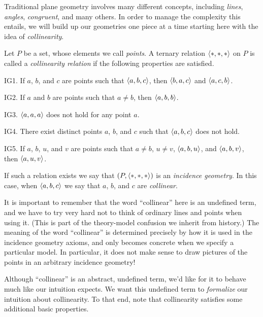 Traditional plane geometry involves many different concepts, including \emph{lines}, \emph{angles}, \emph{congruent}, and many others.
In order to manage the complexity this entails, we will build up our geometries one piece at a time starting here with the idea of \emph{collinearity}.

\begin{dfn} \label{dfn:incidence-geometry}
Let \(P\) be a set, whose elements we call \emph{points}.
A ternary relation \(\langle \ast, \ast, \ast \rangle\) on \(P\) is called a \emph{collinearity relation} if the following properties are satisfied.
\begin{proplist}
\item[IG1.] If \(a\), \(b\), and \(c\) are points such that \(\langle a, b, c \rangle\), then \(\langle b, a, c \rangle\) and \(\langle a, c, b \rangle\).
\item[IG2.] If \(a\) and \(b\) are points such that \(a \neq b\), then \(\langle a, b, b \rangle\).
\item[IG3.] \(\langle a, a, a \rangle\) does not hold for any point \(a\).
\item[IG4.] There exist distinct points \(a\), \(b\), and \(c\) such that \(\langle a, b, c \rangle\) does not hold.
\item[IG5.] If \(a\), \(b\), \(u\), and \(v\) are points such that \(a \neq b\), \(u \neq v\), \(\langle a, b, u \rangle\), and \(\langle a, b, v \rangle\), then \(\langle a, u, v \rangle\).
\end{proplist}
If such a relation exists we say that \((P, \langle \ast, \ast, \ast \rangle)\) is an \emph{incidence geometry}.
In this case, when \(\langle a, b, c \rangle\) we say that \(a\), \(b\), and \(c\) are \emph{collinear}.
\end{dfn}

It is important to remember that the word ``collinear'' here is an undefined term, and we have to try very hard not to think of ordinary lines and points when using it.
(This is part of the theory-model confusion we inherit from history.)
The meaning of the word ``collinear'' is determined precisely by how it is used in the incidence geometry axioms, and only becomes concrete when we specify a particular model.
In particular, it does not make sense to draw pictures of the points in an arbitrary incidence geometry!

Although ``collinear'' is an abstract, undefined term, we'd like for it to behave much like our intuition expects.
We want this undefined term to \emph{formalize} our intuition about collinearity.
To that end, note that collinearity satisfies some additional basic properties.

